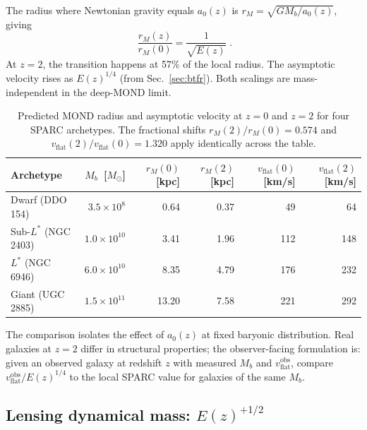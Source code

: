 \documentclass[
    aps,
    prd,
    reprint,
    superscriptaddress,
    nofootinbib,
    floatfix
]{revtex4-2}
\begin{document}
The radius where Newtonian gravity equals $a_0(z)$ is
$r_M = \sqrt{G M_b / a_0(z)}$, giving
\begin{equation}
\boxed{\;\frac{r_M(z)}{r_M(0)} = \frac{1}{\sqrt{E(z)}}\;}.
\label{eq:rM-ratio}
\end{equation}
At $z = 2$, the transition happens at 57\% of the local radius. The
asymptotic velocity rises as $E(z)^{1/4}$ (from
Sec.~\ref{sec:btfr}). Both scalings are mass-independent in the
deep-MOND limit.

\begin{table}[tb]
\caption{\label{tab:archetypes}Predicted MOND radius and asymptotic
velocity at $z = 0$ and $z = 2$ for four SPARC archetypes. The
fractional shifts $r_M(2)/r_M(0) = 0.574$ and
$v_\text{flat}(2)/v_\text{flat}(0) = 1.320$ apply identically across
the table.}
\begin{ruledtabular}
\begin{tabular}{lrrrrr}
Archetype & $M_b$~[$M_\odot$]
  & $r_M(0)$~[kpc] & $r_M(2)$~[kpc]
  & $v_\text{flat}(0)$~[km/s] & $v_\text{flat}(2)$~[km/s] \\
\hline
Dwarf (DDO 154)         & $3.5 \times 10^{8}$  & 0.64  & 0.37 & 49  & 64  \\
Sub-$L^*$ (NGC 2403)    & $1.0 \times 10^{10}$ & 3.41  & 1.96 & 112 & 148 \\
$L^*$ (NGC 6946)        & $6.0 \times 10^{10}$ & 8.35  & 4.79 & 176 & 232 \\
Giant (UGC 2885)        & $1.5 \times 10^{11}$ & 13.20 & 7.58 & 221 & 292 \\
\end{tabular}
\end{ruledtabular}
\end{table}

The comparison isolates the effect of $a_0(z)$ at fixed baryonic
distribution. Real galaxies at $z = 2$ differ in structural
properties; the observer-facing formulation is: given an observed
galaxy at redshift $z$ with measured $M_b$ and
$v_\text{flat}^{\text{obs}}$, compare
$v_\text{flat}^{\text{obs}}/E(z)^{1/4}$ to the local SPARC value for
galaxies of the same $M_b$.

\subsection{Lensing dynamical mass: $E(z)^{+1/2}$}
\label{sec:lensing}
\end{document}

